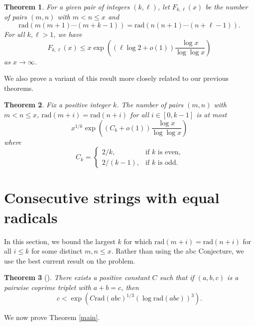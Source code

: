 \documentclass{article}
\theoremstyle{plain}
\newtheorem{thm}{Theorem}
\theoremstyle{definition}
\begin{document}
\begin{thm} \label{F thm} For a given pair of integers $(k, \ell)$, let $F_{k, \ell} (x)$ be the number of pairs $(m, n)$ with $m < n \leq x$ and
\[\textrm{rad} (m(m + 1) \cdots (m + k - 1)) = \textrm{rad} (n(n + 1) \cdots (n + \ell - 1)).\]
For all $k, \ell > 1$, we have
\[F_{k, \ell} (x) \leq x \exp\left((\ell \log 2 + o(1)) \frac{\log x}{\log \log x}\right)\]
as $x \to \infty$.
\end{thm}

We also prove a variant of this result more closely related to our previous theorems.

\begin{thm} \label{pairs thm} Fix a positive integer $k$. The number of pairs $(m, n)$ with $m < n \leq x$, $\textrm{rad} (m + i) = \textrm{rad} (n + i)$ for all $i \in [0, k - 1]$ is at most
\[x^{1/k} \exp\left((C_k + o(1)) \frac{\log x}{\log \log x}\right)\]
where
\[C_k = \left\{\begin{array}{ll}
2/k, & \textrm{if } k \textrm{ is even,} \\
2/(k - 1), & \textrm{if } k \textrm{ is odd.}
\end{array}\right.\]
\end{thm}

\section{Consecutive strings with equal radicals}

In this section, we bound the largest $k$ for which $\textrm{rad}(m + i) = \textrm{rad}(n + i)$ for all $i \leq k$ for some distinct $m, n \leq x$. Rather than using the abc Conjecture, we use the best current result on the problem.

\begin{thm}[{\cite{StY2}}] There exists a positive constant $C$ such that if $(a, b, c)$ is a pairwise coprime triplet with $a + b = c$, then
\[c < \exp(C \textrm{rad}(abc)^{1/3} (\log \textrm{rad} (abc))^3).\]
\end{thm}

We now prove Theorem \ref{main}.
\end{document}
